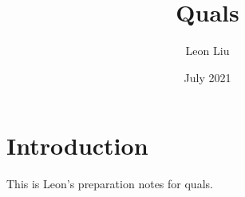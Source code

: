 \documentclass[11pt]{article}
\title{Quals}
\author{Leon Liu }
\date{July 2021}
\numberwithin{equation}{subsection}%
\theoremstyle{definition}
\theoremstyle{remark}
\begin{document}
\maketitle

\section{Introduction}
This is Leon's preparation notes for quals.
\end{document}
